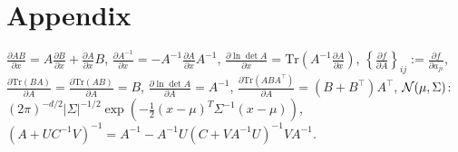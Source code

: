 \section{Appendix}



$\frac{\partial AB}{\partial x}=A\frac{\partial B}{\partial x}+\frac{\partial A}{\partial x}B$, 
$\frac{\partial A^{-1}}{\partial x}=-A^{-1}\frac{\partial A}{\partial x}A^{-1}$, 
$\frac{\partial\ln\det A}{\partial x} = \mathrm{Tr}\left(A^{-1}\frac{\partial A}{\partial x}\right)$,
$\left\{\frac{\partial f}{\partial A}\right\}_{ij}:=\frac{\partial f}{\partial a_{ji}}$,
$\frac{\partial\mathrm{Tr}(BA)}{\partial A} = \frac{\partial\mathrm{Tr}(AB)}{\partial A}=B$,
$\frac{\partial\ln\det A}{\partial A}=A^{-1}$,
$\frac{\partial\mathrm{Tr}(ABA^{\top})}{\partial A}=(B+B^{\top})A^{\top}$,
$\mathcal{N}(\mu,\Sigma)$: $(2\pi)^{-d/2}|\Sigma|^{-1/2}\exp(-\frac{1}{2}(x-\mu)^T \Sigma^{-1} (x-\mu))$,
$(A + U C^{-1} V)^{-1} = A^{-1} - A^{-1}U(C+VA^{-1}U)^{-1}V A^{-1}$.

